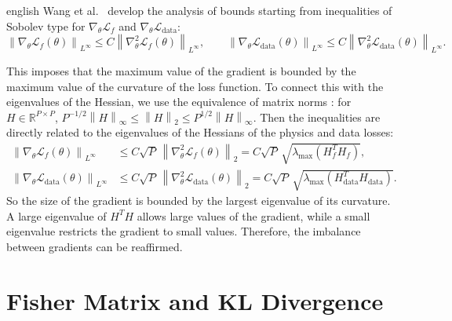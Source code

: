\documentclass[12pt,letterpaper,twoside]{book}
\newcommand{\norm}[1]{\left\lVert #1 \right\rVert}
\newcommand{\Loss}{\mathcal{L}}
\newif\ifreviewmode
\newcommand{\revtag}[2]{\ifreviewmode{\color{red!70!black}\textsf{\footnotesize[#1#2]}}\fi}
\newcommand{\verificar}[1]{\revtag{VERIFICAR}{: #1}}
\begin{document}
\begin{hyphenrules}{english}
Wang et al.~\cite{wang2021gradient} develop the analysis of bounds starting from inequalities of Sobolev type
for $\nabla_\theta\Loss_f$ and $\nabla_\theta\Loss_{\mathrm{data}}$:
\begin{equation}
  \norm{\nabla_\theta\Loss_f(\theta)}_{L^\infty}\le C\norm{\nabla^2_\theta\Loss_f(\theta)}_{L^\infty},\qquad
  \norm{\nabla_\theta\Loss_{\mathrm{data}}(\theta)}_{L^\infty}\le C\norm{\nabla^2_\theta\Loss_{\mathrm{data}}(\theta)}_{L^\infty}.
  \label{eq:grad-bounds}
\end{equation}
\verificar{exact form and hypotheses of these inequalities in Wang et al.\ (2021)}
This imposes that the maximum value of the gradient is bounded by the maximum value of the curvature of
the loss function. To connect this with the eigenvalues of the Hessian, we use the equivalence of matrix
norms \cite{trefethen1997}: for $H\in\mathbb{R}^{P\times P}$,
$P^{-1/2}\norm{H}_\infty\le\norm{H}_2\le P^{1/2}\norm{H}_\infty$. Then the inequalities are directly related
to the eigenvalues of the Hessians of the physics and data losses:
\begin{align}
  \norm{\nabla_\theta\Loss_f(\theta)}_{L^\infty}&\le C\sqrt{P}\,\norm{\nabla^2_\theta\Loss_f(\theta)}_{2}
  =C\sqrt{P}\,\sqrt{\lambda_{\max}(H_f^{T}H_f)}, \label{eq:bound-f}\\
  \norm{\nabla_\theta\Loss_{\mathrm{data}}(\theta)}_{L^\infty}&\le C\sqrt{P}\,\norm{\nabla^2_\theta\Loss_{\mathrm{data}}(\theta)}_{2}
  =C\sqrt{P}\,\sqrt{\lambda_{\max}(H_{\mathrm{data}}^{T}H_{\mathrm{data}})}. \label{eq:bound-data}
\end{align}
So the size of the gradient is bounded by the largest eigenvalue of its curvature. A large eigenvalue of
$H^{T}H$ allows large values of the gradient, while a small eigenvalue restricts the gradient to small
values. Therefore, the imbalance between gradients can be reaffirmed.


\section{Fisher Matrix and KL Divergence}\label{app:fisher}


\end{hyphenrules}
\end{document}
